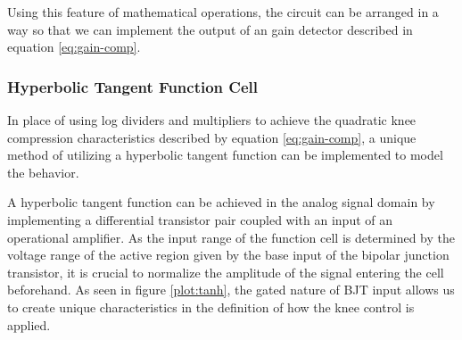 \documentclass[10pt]{article}
\begin{document}
\begin{multicols*}{2}
\begin{minipage}{\linewidth}
\begin{tikzpicture}[scale = 0.9, transform shape]
                            \end{tikzpicture}

                            \label{fig:pwr-mng}

                        \end{minipage}

                    \vspace{2ex}

                    \noindent Using this feature of mathematical operations, the circuit can be arranged in a way so that we can implement the output of an gain detector described in equation \ref{eq:gain-comp}.

                \subsubsection{Hyperbolic Tangent Function Cell}
                    In place of using log dividers and multipliers to achieve the quadratic knee compression characteristics described by equation \ref{eq:gain-comp}, a unique method of utilizing a hyperbolic tangent function can be implemented to model the behavior.\par
                    A hyperbolic tangent function can be achieved in the analog signal domain by implementing a differential transistor pair coupled with an input of an operational amplifier. As the input range of the function cell is determined by the voltage range of the active region given by the base input of the bipolar junction transistor, it is crucial to normalize the amplitude of the signal entering the cell beforehand. As seen in figure \ref{plot:tanh}, the gated nature of BJT input allows us to create unique characteristics in the definition of how the knee control is applied.

                        \noindent
                        \begin{minipage}{\linewidth}


\end{minipage}
\end{multicols*}
\end{document}
